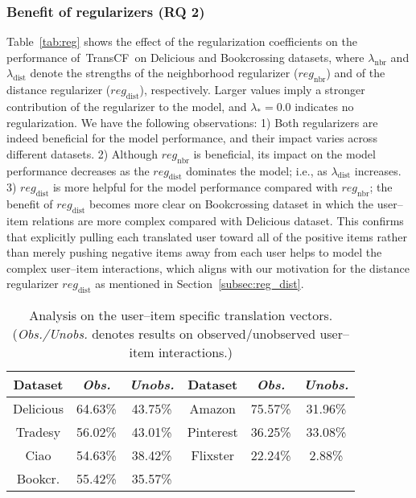 \documentclass[conference]{IEEEtran}
\newcommand{\propose}{\textsf{{TransCF}}}
\begin{document}
\subsubsection{\textbf{Benefit of regularizers (RQ 2)}}
\label{sec:exp_reg}
Table~\ref{tab:reg} shows the effect of the regularization coefficients on the performance of~\propose~on Delicious and Bookcrossing datasets, where $\lambda_{\mathrm{nbr}}$ and $\lambda_{\mathrm{dist}}$ denote the strengths of the neighborhood regularizer ($reg_{\mathrm{nbr}}$) and of the distance regularizer ($reg_{\mathrm{dist}}$), respectively. Larger values imply a stronger contribution of the regularizer to the model, and $\lambda_*=0.0$ indicates no regularization.
We have the following observations: 1)
Both regularizers are indeed beneficial for the model performance, and their impact varies across different datasets. 2) Although $reg_{\mathrm{nbr}}$ is beneficial, its impact on the model performance decreases as the $reg_{\mathrm{dist}}$ dominates the model; i.e., as $\lambda_{\mathrm{dist}}$ increases.
3) $reg_{\mathrm{dist}}$  is more helpful for the model performance compared with $reg_{\mathrm{nbr}}$; the benefit of $reg_{\mathrm{dist}}$ becomes more clear on Bookcrossing dataset in which the user--item relations are more complex compared with Delicious dataset. This confirms that explicitly pulling each translated user toward all of the positive items rather than merely pushing negative items away from each user helps to model the complex user--item interactions, which aligns with our motivation for the distance regularizer $reg_{\mathrm{dist}}$ as mentioned in Section~\ref{subsec:reg_dist}.





\begin{table}[h]
	\centering
\caption{Analysis on the user--item specific translation vectors. (\textit{Obs./Unobs.} denotes results on observed/unobserved user--item interactions.)}
	\vspace{-1ex}
	\label{tab:posneg}
\begin{tabular}{c|cc||c|cc}
		\hline
		Dataset & \textit{Obs.} & \textit{Unobs.}&Dataset & \textit{Obs.} & \textit{Unobs.} \\
		\hline
		\hline
		Delicious    & 64.63\%  & 43.75\% &Amazon   & 75.57\%  & 31.96\%    \\
		Tradesy      & 56.02\%  & 43.01\% &Pinterest    & 36.25\%  & 33.08\%    \\
		Ciao         & 54.63\%  & 38.42\% &Flixster    & 22.24\%  & 2.88\%         \\
		Bookcr. & 55.42\%  & 35.57\%   &&& \\
		\hline
	\end{tabular}
	\vspace{-2ex}
\end{table}
\end{document}
